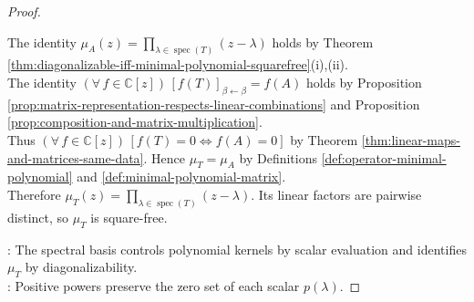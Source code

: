 \begin{corollary}
\begin{proof}
\begin{enumerate}[label=(\roman*)]
The identity $\mu_A(z)=\prod\limits_{\lambda\in\operatorname{spec}(T)}(z-\lambda)$ holds by Theorem \ref{thm:diagonalizable-iff-minimal-polynomial-squarefree}(i),(ii).\\
The identity $(\forall\,f\in\mathbb{C}[z])\,[f(T)]_{\beta\leftarrow\beta}=f(A)$ holds by Proposition \ref{prop:matrix-representation-respects-linear-combinations} and Proposition \ref{prop:composition-and-matrix-multiplication}.\\
Thus $(\forall\,f\in\mathbb{C}[z])\,[f(T)=0\Longleftrightarrow f(A)=0]$ by Theorem \ref{thm:linear-maps-and-matrices-same-data}. Hence $\mu_T=\mu_A$ by Definitions \ref{def:operator-minimal-polynomial} and \ref{def:minimal-polynomial-matrix}.\\
Therefore $\mu_T(z)=\prod\limits_{\lambda\in\operatorname{spec}(T)}(z-\lambda)$. Its linear factors are pairwise distinct, so $\mu_T$ is square-free.
\end{enumerate}
: The spectral basis controls polynomial kernels by scalar evaluation and identifies $\mu_T$ by diagonalizability.\\
: Positive powers preserve the zero set of each scalar $p(\lambda)$.
\end{proof}
\end{corollary}

